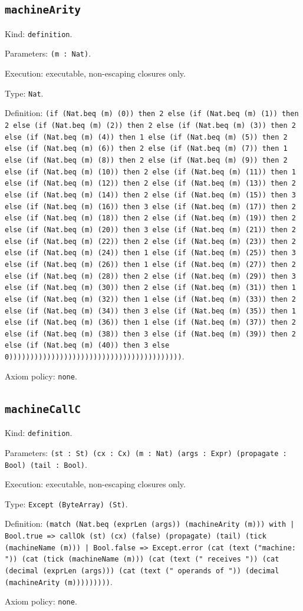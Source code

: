 \documentclass[11pt]{article}
\begin{document}
\subsection*{\texttt{machineArity}}
\noindent Kind: \texttt{definition}.\par
\noindent Parameters: \texttt{(m : Nat)}.\par
\noindent Execution: executable, non-escaping closures only.\par
\noindent Type: \texttt{Nat}.\par
\noindent Definition: \texttt{(if (Nat.beq (m) (0)) then 2 else (if (Nat.beq (m) (1)) then 2 else (if (Nat.beq (m) (2)) then 2 else (if (Nat.beq (m) (3)) then 2 else (if (Nat.beq (m) (4)) then 1 else (if (Nat.beq (m) (5)) then 2 else (if (Nat.beq (m) (6)) then 2 else (if (Nat.beq (m) (7)) then 1 else (if (Nat.beq (m) (8)) then 2 else (if (Nat.beq (m) (9)) then 2 else (if (Nat.beq (m) (10)) then 2 else (if (Nat.beq (m) (11)) then 1 else (if (Nat.beq (m) (12)) then 2 else (if (Nat.beq (m) (13)) then 2 else (if (Nat.beq (m) (14)) then 2 else (if (Nat.beq (m) (15)) then 3 else (if (Nat.beq (m) (16)) then 3 else (if (Nat.beq (m) (17)) then 2 else (if (Nat.beq (m) (18)) then 2 else (if (Nat.beq (m) (19)) then 2 else (if (Nat.beq (m) (20)) then 3 else (if (Nat.beq (m) (21)) then 2 else (if (Nat.beq (m) (22)) then 2 else (if (Nat.beq (m) (23)) then 2 else (if (Nat.beq (m) (24)) then 1 else (if (Nat.beq (m) (25)) then 3 else (if (Nat.beq (m) (26)) then 1 else (if (Nat.beq (m) (27)) then 2 else (if (Nat.beq (m) (28)) then 2 else (if (Nat.beq (m) (29)) then 3 else (if (Nat.beq (m) (30)) then 2 else (if (Nat.beq (m) (31)) then 1 else (if (Nat.beq (m) (32)) then 1 else (if (Nat.beq (m) (33)) then 2 else (if (Nat.beq (m) (34)) then 3 else (if (Nat.beq (m) (35)) then 1 else (if (Nat.beq (m) (36)) then 1 else (if (Nat.beq (m) (37)) then 2 else (if (Nat.beq (m) (38)) then 3 else (if (Nat.beq (m) (39)) then 2 else (if (Nat.beq (m) (40)) then 3 else 0)))))))))))))))))))))))))))))))))))))))))}.\par
\noindent Axiom policy: \texttt{none}.\par
\subsection*{\texttt{machineCallC}}
\noindent Kind: \texttt{definition}.\par
\noindent Parameters: \texttt{(st : St) (cx : Cx) (m : Nat) (args : Expr) (propagate : Bool) (tail : Bool)}.\par
\noindent Execution: executable, non-escaping closures only.\par
\noindent Type: \texttt{Except (ByteArray) (St)}.\par
\noindent Definition: \texttt{(match (Nat.beq (exprLen (args)) (machineArity (m))) with | Bool.true => callOk (st) (cx) (false) (propagate) (tail) (tick (machineName (m))) | Bool.false => Except.error (cat (text ("machine: ")) (cat (tick (machineName (m))) (cat (text (" receives ")) (cat (decimal (exprLen (args))) (cat (text (" operands of ")) (decimal (machineArity (m)))))))))}.\par
\noindent Axiom policy: \texttt{none}.\par
\end{document}
